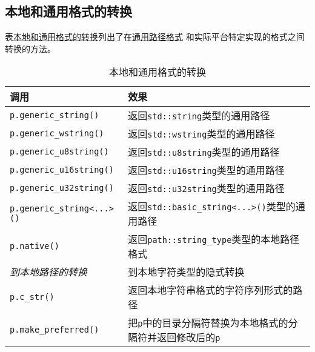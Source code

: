\subsection{本地和通用格式的转换}\label{ch20.3.4}
表\hyperref[t20.6]{本地和通用格式的转换}列出了在\hyperref[ch20.2.3]{通用路径格式}
和实际平台特定实现的格式之间转换的方法。
\begin{table}[ht]
    \centering
    \begin{tabular}{l|l}
        \hline
        \textbf{调用}                       & \textbf{效果}                                    \\
        \hline
        \texttt{p.generic\_string()}      & 返回\texttt{std::string}类型的通用路径                  \\
        \texttt{p.generic\_wstring()}     & 返回\texttt{std::wstring}类型的通用路径                 \\
        \texttt{p.generic\_u8string()}    & 返回\texttt{std::u8string}类型的通用路径                \\
        \texttt{p.generic\_u16string()}   & 返回\texttt{std::u16string}类型的通用路径               \\
        \texttt{p.generic\_u32string()}   & 返回\texttt{std::u32string}类型的通用路径               \\
        \texttt{p.generic\_string<...>()} & 返回\texttt{std::basic\_string<...>()}类型的通用路径    \\
        \texttt{p.native()}               & 返回\texttt{path::string\_type}类型的本地路径格式         \\
        \emph{到本地路径的转换}                   & 到本地字符类型的隐式转换                                   \\
        \texttt{p.c\_str()}               & 返回本地字符串格式的字符序列形式的路径                            \\
        \texttt{p.make\_preferred()}      & 把\texttt{p}中的目录分隔符替换为本地格式的分隔符并返回修改后的\texttt{p} \\
        \hline
    \end{tabular}
    \caption{本地和通用格式的转换}
    \label{t20.6}
\end{table}

